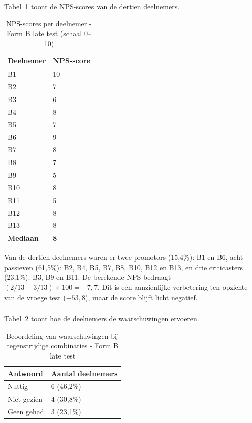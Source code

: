 Tabel~\ref{tab:laat-formb-nps} toont de NPS-scores van de dertien deelnemers.

\begin{table}[h]
  \centering
  \caption[NPS-scores late test Form B]{NPS-scores per deelnemer - Form B late test (schaal 0–10)}
  \label{tab:laat-formb-nps}
  \begin{tabular}{ll}
    \hline
    \textbf{Deelnemer} & \textbf{NPS-score} \\
    \hline
    B1  & 10 \\
    B2  & 7  \\
    B3  & 6  \\
    B4  & 8  \\
    B5  & 7  \\
    B6  & 9  \\
    B7  & 8  \\
    B8  & 7  \\
    B9  & 5  \\
    B10 & 8  \\
    B11 & 5  \\
    B12 & 8  \\
    B13 & 8  \\
    \hline
    \textbf{Mediaan} & \textbf{8} \\
    \hline
  \end{tabular}
\end{table}

Van de dertien deelnemers waren er twee promotors (15,4\%): B1 en B6, acht passieven (61,5\%): B2, B4, B5, B7, B8, B10, B12 en B13, en drie criticasters (23,1\%): B3, B9 en B11. De berekende NPS bedraagt $(2/13 - 3/13) \times 100 = -7{,}7$. Dit is een aanzienlijke verbetering ten opzichte van de vroege test ($-53{,}8$), maar de score blijft licht negatief.

\subsubsection{}

Tabel~\ref{tab:laat-formb-waarschuwingen} toont hoe de deelnemers de waarschuwingen ervoeren.

\begin{table}[h]
  \centering
  \caption[Beoordeling waarschuwingen late test Form B]{Beoordeling van waarschuwingen bij tegenstrijdige combinaties - Form B late test}
  \label{tab:laat-formb-waarschuwingen}
  \begin{tabular}{ll}
    \hline
    \textbf{Antwoord} & \textbf{Aantal deelnemers} \\
    \hline
    Nuttig      & 6 (46,2\%) \\
    Niet gezien & 4 (30,8\%) \\
    Geen gehad  & 3 (23,1\%) \\
    \hline
  \end{tabular}
\end{table}

